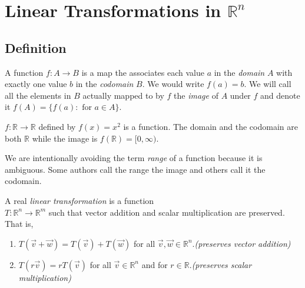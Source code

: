 \section{Linear Transformations in $\mathbb{R}^n$}
\subsection{Definition}

\begin{definition}[Function]
A function $f:A \to B$ is a map the associates each value $a$ in the  
\emph{domain} $A$ with exactly one value $b$ in the \emph{codomain} $B$. 
We would write $f(a)=b$. We will call all the elements in $B$ actually mapped 
to by $f$ the \emph{image} of $A$ under $f$ and denote it 
$f(A)=\{ f(a):\text{ for } a \in A  \}$.
\end{definition}
\begin{example}$f:\mathbb{R} \to \mathbb{R}$ defined by $f(x)=x^2$ is a 
function. The domain  and the codomain are both $\mathbb{R}$ while the 
image is $f(\mathbb{R})=[0,\infty )$.
\end{example}
\begin{remark}
We are intentionally avoiding the term \emph{range} of a function because it is 
ambiguous. Some authors call the range the image and others call it the 
codomain.
\end{remark}
\begin{definition}
A real \emph{linear transformation} is a function\\ 
$T: \mathbb{R}^n \to \mathbb{R}^m$ such that vector addition and scalar 
multiplication are preserved. That is, 
\begin{enumerate}
\item $T(\vec{v}+\vec{w})=T(\vec{v})+T(\vec{w})$ for all 
$\vec{v},\vec{w} \in \mathbb{R}^n$.\hfill \emph{(preserves vector addition)}
\item $T(r\vec{v})=r T(\vec{v})$ for all $\vec{v}\in \mathbb{R}^n$ 
and for $r \in \mathbb{R}$.\hfill \emph{(preserves scalar multiplication)}
\end{enumerate}
\end{definition}

